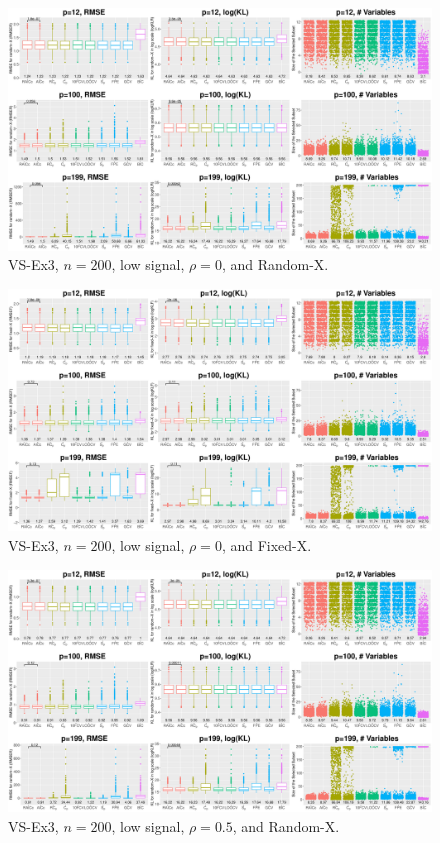 \clearpage
\begin{figure}[!ht]
\centering
\includegraphics[width=\textwidth]{figures/supplement/randomx_VS-Ex3_n200_lsnr_rho0.eps}
\caption{VS-Ex3, $n=200$, low signal, $\rho=0$, and Random-X.}
\end{figure}
\begin{figure}[!ht]
\centering
\includegraphics[width=\textwidth]{figures/supplement/fixedx_VS-Ex3_n200_lsnr_rho0.eps}
\caption{VS-Ex3, $n=200$, low signal, $\rho=0$, and Fixed-X.}
\end{figure}
\clearpage
\begin{figure}[!ht]
\centering
\includegraphics[width=\textwidth]{figures/supplement/randomx_VS-Ex3_n200_lsnr_rho05.eps}
\caption{VS-Ex3, $n=200$, low signal, $\rho=0.5$, and Random-X.}
\end{figure}
